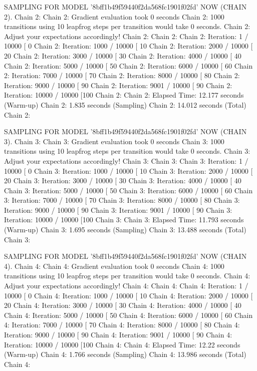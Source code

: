 \documentclass[
]{jss}
\begin{document}
\begin{CodeChunk}
\begin{CodeOutput}
SAMPLING FOR MODEL '8bff1b49f59440f2da568fc1901f02fd' NOW (CHAIN 2).
Chain 2: 
Chain 2: Gradient evaluation took 0 seconds
Chain 2: 1000 transitions using 10 leapfrog steps per transition would take 0 seconds.
Chain 2: Adjust your expectations accordingly!
Chain 2: 
Chain 2: 
Chain 2: Iteration:    1 / 10000 [  0%
Chain 2: Iteration: 1000 / 10000 [ 10%
Chain 2: Iteration: 2000 / 10000 [ 20%
Chain 2: Iteration: 3000 / 10000 [ 30%
Chain 2: Iteration: 4000 / 10000 [ 40%
Chain 2: Iteration: 5000 / 10000 [ 50%
Chain 2: Iteration: 6000 / 10000 [ 60%
Chain 2: Iteration: 7000 / 10000 [ 70%
Chain 2: Iteration: 8000 / 10000 [ 80%
Chain 2: Iteration: 9000 / 10000 [ 90%
Chain 2: Iteration: 9001 / 10000 [ 90%
Chain 2: Iteration: 10000 / 10000 [100%
Chain 2: 
Chain 2:  Elapsed Time: 12.177 seconds (Warm-up)
Chain 2:                1.835 seconds (Sampling)
Chain 2:                14.012 seconds (Total)
Chain 2: 

SAMPLING FOR MODEL '8bff1b49f59440f2da568fc1901f02fd' NOW (CHAIN 3).
Chain 3: 
Chain 3: Gradient evaluation took 0 seconds
Chain 3: 1000 transitions using 10 leapfrog steps per transition would take 0 seconds.
Chain 3: Adjust your expectations accordingly!
Chain 3: 
Chain 3: 
Chain 3: Iteration:    1 / 10000 [  0%
Chain 3: Iteration: 1000 / 10000 [ 10%
Chain 3: Iteration: 2000 / 10000 [ 20%
Chain 3: Iteration: 3000 / 10000 [ 30%
Chain 3: Iteration: 4000 / 10000 [ 40%
Chain 3: Iteration: 5000 / 10000 [ 50%
Chain 3: Iteration: 6000 / 10000 [ 60%
Chain 3: Iteration: 7000 / 10000 [ 70%
Chain 3: Iteration: 8000 / 10000 [ 80%
Chain 3: Iteration: 9000 / 10000 [ 90%
Chain 3: Iteration: 9001 / 10000 [ 90%
Chain 3: Iteration: 10000 / 10000 [100%
Chain 3: 
Chain 3:  Elapsed Time: 11.793 seconds (Warm-up)
Chain 3:                1.695 seconds (Sampling)
Chain 3:                13.488 seconds (Total)
Chain 3: 

SAMPLING FOR MODEL '8bff1b49f59440f2da568fc1901f02fd' NOW (CHAIN 4).
Chain 4: 
Chain 4: Gradient evaluation took 0 seconds
Chain 4: 1000 transitions using 10 leapfrog steps per transition would take 0 seconds.
Chain 4: Adjust your expectations accordingly!
Chain 4: 
Chain 4: 
Chain 4: Iteration:    1 / 10000 [  0%
Chain 4: Iteration: 1000 / 10000 [ 10%
Chain 4: Iteration: 2000 / 10000 [ 20%
Chain 4: Iteration: 3000 / 10000 [ 30%
Chain 4: Iteration: 4000 / 10000 [ 40%
Chain 4: Iteration: 5000 / 10000 [ 50%
Chain 4: Iteration: 6000 / 10000 [ 60%
Chain 4: Iteration: 7000 / 10000 [ 70%
Chain 4: Iteration: 8000 / 10000 [ 80%
Chain 4: Iteration: 9000 / 10000 [ 90%
Chain 4: Iteration: 9001 / 10000 [ 90%
Chain 4: Iteration: 10000 / 10000 [100%
Chain 4: 
Chain 4:  Elapsed Time: 12.22 seconds (Warm-up)
Chain 4:                1.766 seconds (Sampling)
Chain 4:                13.986 seconds (Total)
Chain 4: 


\end{CodeOutput}
\end{CodeChunk}
\end{document}
